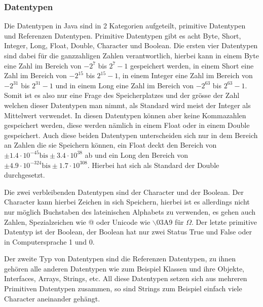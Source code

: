 \subsubsection{Datentypen}
Die Datentypen in Java sind in 2 Kategorien aufgeteilt, primitive Datentypen und Referenzen Datentypen. Primitive Datentypen gibt es acht Byte, Short, Integer, Long, Float, Double, Character und Boolean. Die ersten vier Datentypen sind dabei für die ganzzahligen Zahlen verantwortlich, hierbei kann in einem Byte eine Zahl im Bereich von $-2^7$ bis $2^7-1$ gespeichert werden, in einem Short eine Zahl im Bereich von $-2^{15}$ bis $2^{15}-1$, in einem Integer eine Zahl im Bereich von $-2^{31}$ bis $2^{31}-1$ und in einem Long eine Zahl im Bereich von $-2^{63}$ bis $2^{63}-1$. Somit ist es also nur eine Frage des Speicherplatzes und der grösse der Zahl welchen dieser Datentypen man nimmt, als Standard wird meist der Integer als Mittelwert verwendet. In diesen Datentypen können aber keine Kommazahlen gespeichert werden, diese werden nämlich in einem Float oder in einem Double gespeichert. Auch diese beiden Datentypen unterscheiden sich nur in dem Bereich an Zahlen die sie Speichern können, ein Float deckt den Bereich von $\pm 1.4 \cdot 10^{-45} \text{bis} \pm 3.4 \cdot 10^{38}$ ab und ein Long den Bereich von $\pm 4.9 \cdot 10^{-324} \text{bis} \pm 1.7 \cdot 10^{308}$. Hierbei hat sich als Standard der Double durchgesetzt.\par 
Die zwei verbleibenden Datentypen sind der Character und der Boolean. Der Character kann hierbei Zeichen in sich Speichern, hierbei ist es allerdings nicht nur möglich Buchstaben des lateinischen Alphabets zu verwenden, es gehen auch Zahlen, Spezialzeichen wie @ oder Unicode wie $\backslash$03A9 für $\Omega$. Der letzte primitive Datentyp ist der Boolean, der Boolean hat nur zwei Status True und False oder in Computersprache 1 und 0\cite{studyflix_java_nodate}.\par
Der zweite Typ von Datentypen sind die Referenzen Datentypen, zu ihnen gehören alle anderen Datentypen wie zum Beispiel Klassen und ihre Objekte, Interfaces, Arrays, Strings, etc. All diese Datentypen setzen sich aus mehreren Primitiven Datentypen zusammen, so sind Strings zum Beispiel einfach viele Character aneinander gehängt.


